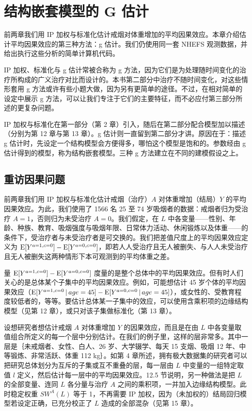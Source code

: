 \chapter[\hspace{0.6em}结构嵌套模型的 G 估计]{结构嵌套模型的 G 估计}

前两章我们用 IP 加权与标准化估计戒烟对体重增加的平均因果效应。本章介绍估计平均因果效应的第三种方法：g 估计。我们仍使用同一套 NHEFS 观测数据，并给出执行这些分析的简单计算机代码。

IP 加权、标准化与 g 估计常被合称为 g 方法，因为它们是为处理随时间变化的治疗所构成的广义治疗对比而设计的。本书第二部分中治疗不随时间变化，对这些情形套用 g 方法或许有些小题大做，因为另有更简单的途径。不过，在相对简单的设定中展示 g 方法，可以让我们专注于它们的主要特征，而不必应付第三部分所述的更复杂问题。

IP 加权与标准化在第一部分（第 2 章）引入，随后在第二部分配合模型加以描述（分别为第 12 章与第 13 章）。g 估计则一直留到第二部分才讲。原因在于：描述 g 估计时，先设定一个结构模型会方便得多，哪怕这个模型是饱和的。参数经由 g 估计得到的模型，称为结构嵌套模型。三种 g 方法建立在不同的建模假设之上。

\section{重访因果问题}

前两章我们用 IP 加权与标准化估计戒烟（治疗）$A$ 对体重增加（结局）$Y$ 的平均因果效应。为此，我们使用了 1566 名 25 至 74 岁吸烟者的数据：戒烟者归为受治疗 $A=1$，否则归为未受治疗 $A=0$。我们假定，在 $L$ 中各变量——性别、年龄、种族、教育、吸烟强度与吸烟年限、日常体力活动、休闲锻炼以及体重——的条件下，受治疗者与未受治疗者是可交换的。我们把差值尺度上的平均因果效应定义为 $\mathrm{E}[Y^{a=1,c=0}]-\mathrm{E}[Y^{a=0,c=0}]$，即若人人受治疗且无人被删失、与人人未受治疗且无人被删失这两种情形下本可观测到的平均体重之差。


量 $\mathrm{E}[Y^{a=1,c=0}]-\mathrm{E}[Y^{a=0,c=0}]$ 度量的是整个总体中的平均因果效应。但有时人们关心的是总体某个子集中的平均因果效应。例如，可能想估计 45 岁个体的平均因果效应（$\mathrm{E}[Y^{a=1,c=0}\,|\, age=45]-\mathrm{E}[Y^{a=0,c=0}\,|\, age=45]$），或女性的、受教育程度较低者的，等等。要估计总体某一子集中的效应，可以使用含乘积项的边缘结构模型（见第 12 章），或只对该子集做标准化（第 13 章）。

设想研究者想估计戒烟 $A$ 对体重增加 $Y$ 的因果效应，而且是在由 $L$ 中各变量取值组合所定义的每一个层中分别估计。在我们的例子里，这样的层非常多。其中一层是｛未戒烟者、女性、白人、26 岁、大学辍学、每天 15 支烟、吸烟 12 年、中等锻炼、非常活跃、体重 112 kg｝。如第 4 章所述，拥有极大数据集的研究者可以把研究总体划分为互斥的子集或互不重叠的层，每一层由 $L$ 中变量的一组特定取值 $l$ 定义，然后估计每一层中的平均因果效应。12.5 节说明，另一种做法是把 $L$ 的全部变量、连同 $L$ 各分量与治疗 $A$ 之间的乘积项，一并加入边缘结构模型。此时稳定权重 $SW^A(L)$ 等于 1，不再需要 IP 加权，因为（未加权的）结局回归模型若设定正确，已充分校正了 $L$ 造成的全部混杂（见第 15 章）。

